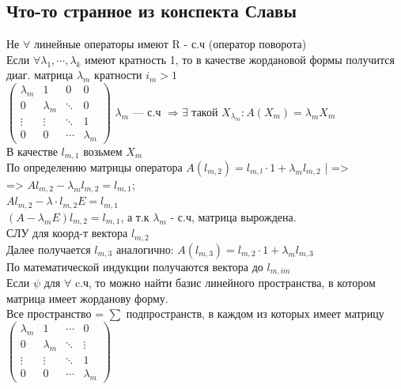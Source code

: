\documentclass[12pt]{article}
\begin{document}
\subsection{Что-то странное из конспекта Славы}
Не \(\forall\) линейные операторы имеют R - с.ч (оператор поворота)\\
Если  \(\forall \lambda_1,\cdots,\lambda_k\) имеют кратность 1, то в качестве жордановой формы получится диаг. матрица \(\lambda_m\) кратности \(i_m > 1\) \\
$
    \begin{pmatrix}
        \lambda_m & 1         & 0      & 0         \\
        0         & \lambda_m & \ddots & 0         \\
        \vdots    & \vdots    & \ddots & 1         \\
        0         & 0         & \cdots & \lambda_m
    \end{pmatrix}$ $\lambda_m$ --- с.ч $\Rightarrow \exists$ такой $X_{\lambda_m} : A(X_m) = \lambda_mX_m$\\
В качестве $l_{m,1}$ возьмем $X_m$\\
По определению матрицы оператора $A(l_{m, 2}) = l_{m, l} \cdot 1 + \lambda_ml_{m, 2}$ | =>\\
=> $Al_{m, 2} - \lambda_ml_{m, 2} = l_{m, 1}$;\\
$Al_{m, 2} - \lambda \cdot l_{m, 2}E = l_{m, 1}$\\
$(A - \lambda_mE)l_{m, 2} = l_{m, 1}$, а т.к $\lambda_m$ - с.ч, матрица вырождена. \\
СЛУ для коорд-т вектора $l_{m, 2}$ \\
Далее получается $l_{m, 3}$ аналогично: $A(l_{m, 3}) = l_{m, 2} \cdot 1 + \lambda_ml_{m, 3}$\\
По математической индукции получаются вектора до $l_{m, im}$\\
Если $\psi$ для $\forall$ c.ч, то можно найти базис линейного пространства, в котором матрица имеет жорданову форму.\\
Все пространство = $\sum$ подпространств, в каждом из которых имеет матрицу
$
    \begin{pmatrix}
        \lambda_m & 1         & \cdots & 0         \\
        0         & \lambda_m & \ddots & \vdots    \\
        \vdots    & \vdots    & \ddots & 1         \\
        0         & 0         & \cdots & \lambda_m
    \end{pmatrix}
$
\end{document}
